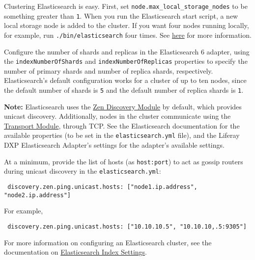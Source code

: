 Clustering Elasticsearch is easy. First, set
\texttt{node.max\_local\_storage\_nodes} to be something greater than
\texttt{1}. When you run the Elasticsearch start script, a new local
storage node is added to the cluster. If you want four nodes running
locally, for example, run \texttt{./bin/elasticsearch} four times. See
\href{https://www.elastic.co/guide/en/elasticsearch/reference/6.1/modules-node.html\#max-local-storage-nodes}{here}
for more information.

Configure the number of shards and replicas in the Elasticsearch 6
adapter, using the \texttt{indexNumberOfShards} and
\texttt{indexNumberOfReplicas} properties to specify the number of
primary shards and number of replica shards, respectively.
Elasticsearch's default configuration works for a cluster of up to ten
nodes, since the default number of shards is \texttt{5} and the default
number of replica shards is \texttt{1}.

\noindent\hrulefill

\textbf{Note:} Elasticsearch uses the
\href{https://www.elastic.co/guide/en/elasticsearch/reference/6.1/modules-discovery-zen.html}{Zen
Discovery Module} by default, which provides unicast discovery.
Additionally, nodes in the cluster communicate using the
\href{https://www.elastic.co/guide/en/elasticsearch/reference/6.1/modules-transport.html}{Transport
Module}, through TCP. See the Elasticsearch documentation for the
available properties (to be set in the \texttt{elasticsearch.yml} file),
and the Liferay DXP Elasticsearch Adapter's settings for the adapter's
available settings.

At a minimum, provide the list of hosts (as \texttt{host:port}) to act
as gossip routers during unicast discovery in the
\texttt{elasticsearch.yml}:

\begin{verbatim}
 discovery.zen.ping.unicast.hosts: ["node1.ip.address", "node2.ip.address"]
\end{verbatim}

For example,

\begin{verbatim}
 discovery.zen.ping.unicast.hosts: ["10.10.10.5", "10.10.10,.5:9305"]
\end{verbatim}

\noindent\hrulefill

For more information on configuring an Elasticsearch cluster, see the
documentation on
\href{https://www.elastic.co/guide/en/elasticsearch/guide/current/_index_settings.html}{Elasticsearch
Index Settings}.

